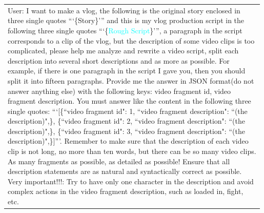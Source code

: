\begin{table}[h!]\centering
    \begin{minipage}{0.98\linewidth}\vspace{0mm}    
    \centering
    \begin{tcolorbox} 
        \centering
        \begin{tabular}{p{0.99\linewidth}}
        \begin{minipage}{0.99\linewidth}
User: I want to make a vlog, the following is the original story enclosed in three single quotes ```\{\textcolor[RGB]{243, 156, 18}{Story}\}''' and this is my vlog production script in the following three single quotes ```\{\textcolor{cyan}{Rough Script}\}''', a paragraph in the script corresponds to a clip of the vlog, but the description of some video clips is too complicated, please help me analyze and rewrite a video script, split each description into several short descriptions and as more as possible. For example, if there is one paragraph in the script I gave you, then you should split it into fifteen paragraphs. Provide me the answer in JSON format(do not answer anything else) with the following keys: video fragment id, video fragment description. You must answer like the content in the following three single quotes: ```[\{``video fragment id": 1, ``video fragment description": ``(the description)",\}, \{``video fragment id": 2, ``video fragment description": ``(the description)",\}, \{``video fragment id": 3, ``video fragment description": ``(the description)",\}]'''. Remember to make sure that the description of each video clip is not long, no more than ten words, but there can be so many video clips. As many fragments as possible, as detailed as possible! Ensure that all description statements are as natural and syntactically correct as possible. Very important!!!: Try to have only one character in the description and avoid complex actions in the video fragment description, such as loaded in, fight, etc.


\end{minipage}
\end{tabular}
\end{tcolorbox}
\end{minipage}
\end{table}
